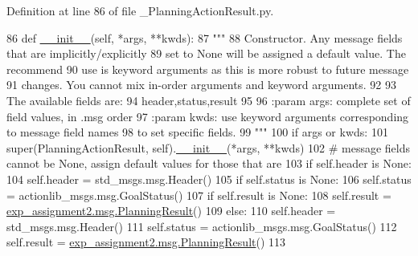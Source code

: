 Definition at line 86 of file \+\_\+\+Planning\+Action\+Result.\+py.


\begin{DoxyCode}
86   \textcolor{keyword}{def }\hyperlink{classstate__machine_1_1Play_a5993a23d8be7f7b2647f71ede0334957}{\_\_init\_\_}(self, *args, **kwds):
87     \textcolor{stringliteral}{"""}
88 \textcolor{stringliteral}{    Constructor. Any message fields that are implicitly/explicitly}
89 \textcolor{stringliteral}{    set to None will be assigned a default value. The recommend}
90 \textcolor{stringliteral}{    use is keyword arguments as this is more robust to future message}
91 \textcolor{stringliteral}{    changes.  You cannot mix in-order arguments and keyword arguments.}
92 \textcolor{stringliteral}{}
93 \textcolor{stringliteral}{    The available fields are:}
94 \textcolor{stringliteral}{       header,status,result}
95 \textcolor{stringliteral}{}
96 \textcolor{stringliteral}{    :param args: complete set of field values, in .msg order}
97 \textcolor{stringliteral}{    :param kwds: use keyword arguments corresponding to message field names}
98 \textcolor{stringliteral}{    to set specific fields.}
99 \textcolor{stringliteral}{    """}
100     \textcolor{keywordflow}{if} args \textcolor{keywordflow}{or} kwds:
101       super(PlanningActionResult, self).\hyperlink{classstate__machine_1_1Play_a5993a23d8be7f7b2647f71ede0334957}{\_\_init\_\_}(*args, **kwds)
102       \textcolor{comment}{# message fields cannot be None, assign default values for those that are}
103       \textcolor{keywordflow}{if} self.header \textcolor{keywordflow}{is} \textcolor{keywordtype}{None}:
104         self.header = std\_msgs.msg.Header()
105       \textcolor{keywordflow}{if} self.status \textcolor{keywordflow}{is} \textcolor{keywordtype}{None}:
106         self.status = actionlib\_msgs.msg.GoalStatus()
107       \textcolor{keywordflow}{if} self.result \textcolor{keywordflow}{is} \textcolor{keywordtype}{None}:
108         self.result = \hyperlink{classexp__assignment2_1_1msg_1_1__PlanningResult_1_1PlanningResult}{exp\_assignment2.msg.PlanningResult}()
109     \textcolor{keywordflow}{else}:
110       self.header = std\_msgs.msg.Header()
111       self.status = actionlib\_msgs.msg.GoalStatus()
112       self.result = \hyperlink{classexp__assignment2_1_1msg_1_1__PlanningResult_1_1PlanningResult}{exp\_assignment2.msg.PlanningResult}()
113 
\end{DoxyCode}


